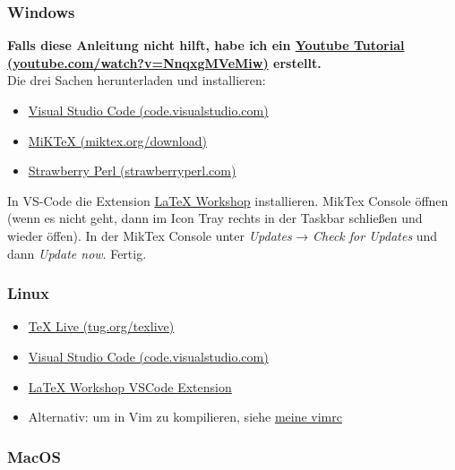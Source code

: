 \documentclass[titlepage]{article}
\begin{document}
\subsubsection{Windows}

\textbf{Falls diese Anleitung nicht hilft, habe ich ein \href{https://www.youtube.com/watch?v=NnqxgMVeMiw}{Youtube Tutorial (youtube.com/watch?v=NnqxgMVeMiw)} erstellt.}\\

Die drei Sachen herunterladen und installieren:
\begin{itemize}
	\item \href{https://code.visualstudio.com/}{Visual Studio Code (code.visualstudio.com)}
	\item \href{https://miktex.org/download}{MiKTeX (miktex.org/download)}
	\item \href{https://strawberryperl.com/}{Strawberry Perl (strawberryperl.com)}
\end{itemize}
In VS-Code die Extension \href{https://open-vsx.org/extension/James-Yu/latex-workshop}{LaTeX Workshop} installieren. MikTex Console öffnen (wenn es nicht geht, dann im Icon Tray rechts in der Taskbar schließen und wieder öffen).
In der MikTex Console unter \textit{Updates} → \textit{Check for Updates} und dann \textit{Update now}. Fertig.
\subsubsection{Linux}
\begin{itemize}
	\item \href{https://tug.org/texlive}{TeX Live (tug.org/texlive)}
	\item \href{https://code.visualstudio.com/}{Visual Studio Code (code.visualstudio.com)}
	\item \href{https://open-vsx.org/extension/James-Yu/latex-workshop}{LaTeX Workshop VSCode Extension}
	\item Alternativ: um in Vim zu kompilieren, siehe \href{https://gitlab.com/sagerer/hyprreis/-/blob/main/.vimrc}{meine vimrc}
\end{itemize}

\subsubsection{MacOS}
\end{document}
